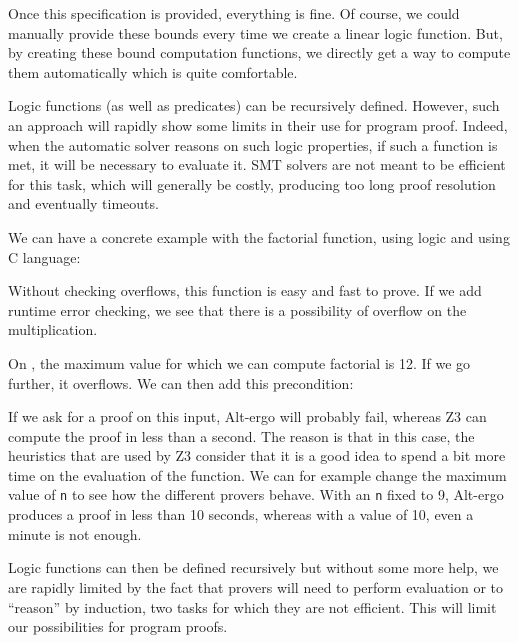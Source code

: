 Once this specification is provided, everything is fine. Of course, we
could manually provide these bounds every time we create a linear logic
function. But, by creating these bound computation functions, we directly
get a way to compute them automatically which is quite comfortable.





Logic functions (as well as predicates) can be recursively defined.
However, such an approach will rapidly show some limits in their use for
program proof. Indeed, when the automatic solver reasons on such logic
properties, if such a function is met, it will be necessary to evaluate it.
SMT solvers are not meant to be efficient for this task, which will generally
be costly, producing too long proof resolution and eventually timeouts.

We can have a concrete example with the factorial function, using logic
and using C language:






Without checking overflows, this function is easy and fast to prove. If
we add runtime error checking, we see that there is a possibility of
overflow on the multiplication.



On , the maximum value for which we can compute
factorial is 12. If we go further, it overflows. We can then add this
precondition:






If we ask for a proof on this input, Alt-ergo will probably fail,
whereas Z3 can compute the proof in less than a second. The reason is
that in this case, the heuristics that are used by Z3 consider that it
is a good idea to spend a bit more time on the evaluation of the
function. We can for example change the maximum value of \texttt{n} to
see how the different provers behave. With an \texttt{n} fixed to 9,
Alt-ergo produces a proof in less than 10 seconds, whereas with a value
of 10, even a minute is not enough.



Logic functions can then be defined recursively but without some more
help, we are rapidly limited by the fact that provers will need to
perform evaluation or to ``reason'' by induction, two tasks for which
they are not efficient. This will limit our possibilities for program
proofs.


